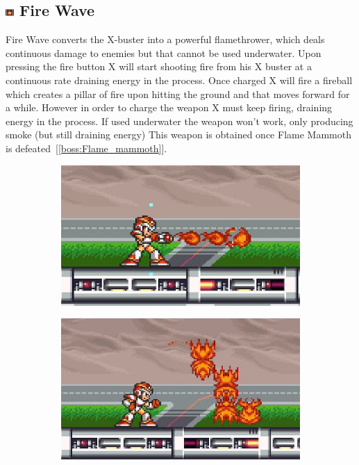 \subsection{\includegraphics[width=12px, height=10px]{figures/X1/weapons/F_wave.jpg} Fire Wave}\label{Fire_wave}
Fire Wave converts the X-buster into a powerful flamethrower, which deals continuous damage to enemies but that cannot be used underwater. Upon pressing the fire button X will start shooting fire from his X buster at a continuous rate draining energy in the process. Once charged X will fire a fireball which creates a pillar of fire upon hitting the ground and that moves forward for a while. However in order to charge the weapon X must keep firing, draining energy in the process. If used underwater the weapon won't work, only producing smoke (but still draining energy)  This weapon is obtained once Flame Mammoth is defeated~[\ref{boss:Flame_mammoth}]. 
\begin{figure}[htp]
	\centering
	\begin{subfigure}{0.35\linewidth}
		\centering
		\includegraphics[width=\linewidth]{figures/X1/weapons/Fire_wave_1.jpg}
	\end{subfigure}
	\begin{subfigure}{0.35\linewidth}
		\centering
		\includegraphics[width=\linewidth]{figures/X1/weapons/Fire_wave_3.jpg}
	\end{subfigure}
\end{figure}
